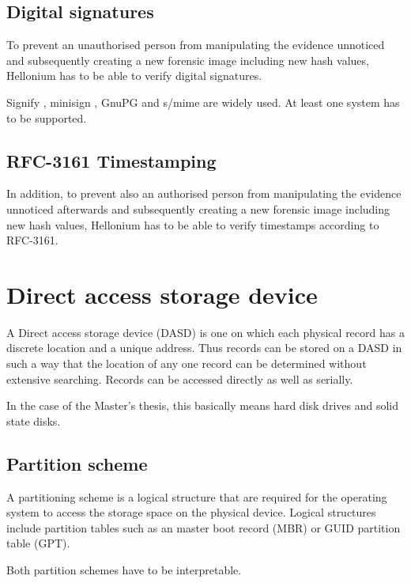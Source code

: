 \subsection{Digital signatures}

To prevent an unauthorised person from manipulating the evidence unnoticed and subsequently creating a new forensic image including new hash values, Hellonium has to be able to verify digital signatures. \cite{Nikkel2016:154}

Signify \cite{Signify}, minisign \cite{Minisign}, GnuPG \cite{GnuPG} and s/mime \cite{SMIME} are widely used. At least one system has to be supported.

\subsection{RFC-3161 Timestamping}

In addition, to prevent also an authorised person from manipulating the evidence unnoticed afterwards and subsequently creating a new forensic image including new hash values, Hellonium has to be able to verify timestamps according to RFC-3161. \cite{Nikkel2016:154}

\section{Direct access storage device}
\label{sec:dasd}

A Direct access storage device (DASD) is one on which each physical record has a discrete location and a unique address. Thus records can be stored on a DASD in such a way that the location of any one record can be determined without extensive searching. Records can be accessed directly as well as serially. \cite{IBM1974}

In the case of the Master's thesis, this basically means hard disk drives and solid state disks.

\subsection{Partition scheme}

A partitioning scheme is a logical structure that are required for the operating system to access the storage space on the physical device. Logical structures include partition tables such as an master boot record (MBR) or GUID partition table (GPT). \cite{Aarnes2017:156}

Both partition schemes have to be interpretable.

